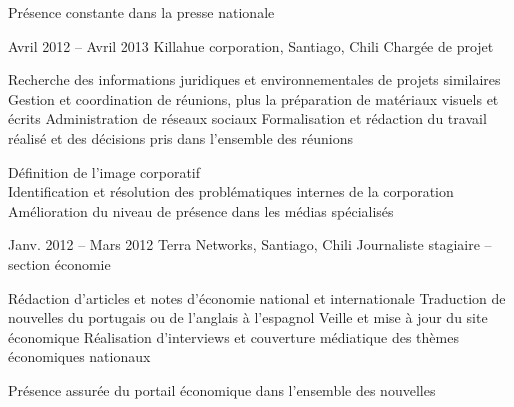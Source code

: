 \documentclass[30pt, french]{tccv}
\begin{document}
\begin{upshape}
\begin{experience}
\begin{itemize}
\end{itemize}       
 Présence constante dans la presse nationale
\vspace{0.5cm}




\setlength{\parskip}{0pt}
\item{Avril 2012 -- Avril 2013 }     
  {Killahue corporation, Santiago, Chili}     
  {Chargée de projet}
\fontsize{9pt}{1em}\color{text}\bodyfontlight\upshape\selectfont
%
     
\setlength{\parskip}{-10pt}
\begin{itemize}
      \setlength\itemsep{-3pt} 
      \cvitem[\checkmark] Recherche des informations juridiques et environnementales de projets similaires          
      \cvitem[\checkmark] Gestion et coordination de réunions, plus la préparation de matériaux visuels et écrits   
      \cvitem[\checkmark] Administration de réseaux sociaux                                                                    
      \cvitem[\checkmark] Formalisation et rédaction du travail réalisé et des décisions pris dans l’ensemble des réunions     
\end{itemize}      

  Définition de l’image corporatif \\
\mission{}            Identification et résolution des problématiques internes de la corporation \\
\mission{} 	      Amélioration du niveau de présence dans les médias spécialisés \\


  
\setlength{\parskip}{0pt}
\item{Janv. 2012 -- Mars 2012 }     
  {Terra Networks, Santiago, Chili}     
  {Journaliste stagiaire – section économie}
  \fontsize{9pt}{1em}\color{text}\bodyfontlight\upshape\selectfont

  
\setlength{\parskip}{-10pt}
\begin{itemize}
      \setlength\itemsep{-3pt} 
      \cvitem[\checkmark] Rédaction d'articles et notes d’économie national et internationale
      \cvitem[\checkmark] Traduction de nouvelles du portugais ou de l'anglais à l'espagnol
      \cvitem[\checkmark] Veille et mise à jour du site économique
      \cvitem[\checkmark] Réalisation d'interviews et couverture médiatique des thèmes économiques nationaux
\end{itemize}        

 Présence assurée du portail économique dans l’ensemble des nouvelles \\
\mission{}           

   

\end{experience}






\end{upshape}
\end{document}
